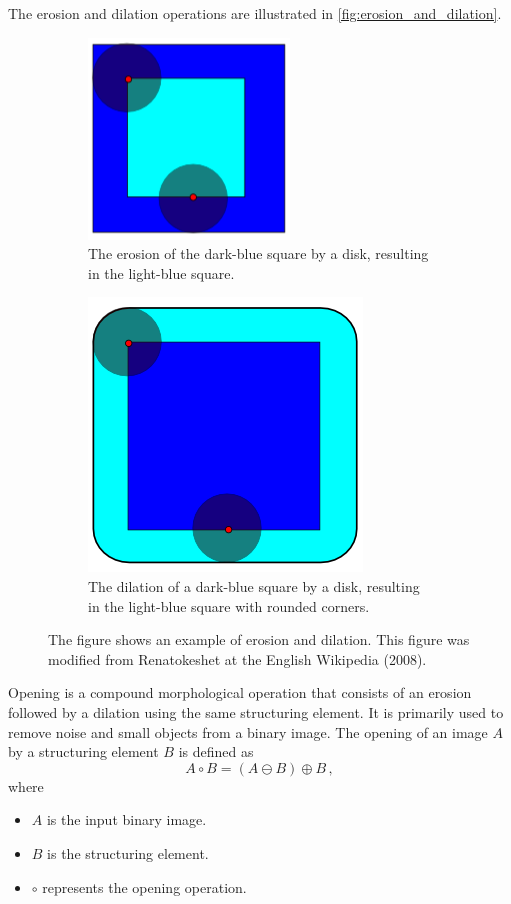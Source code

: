 The erosion and dilation operations are illustrated in \autoref{fig:erosion_and_dilation}.
\begin{figure}[h]
  \centering
  \begin{subfigure}[t]{0.45\textwidth}
    \centering
    \includegraphics[width=0.5\linewidth]{figures/detection/erosion.png}
    \caption{The erosion of the dark-blue square by a disk, resulting in the light-blue square.}
    \label{fig:erosion}
  \end{subfigure}
  \quad
  \begin{subfigure}[t]{0.45\textwidth}
    \centering
    \includegraphics[width=0.5\linewidth]{figures/detection/dilation.png}
    \caption{The dilation of a dark-blue square by a disk, resulting in the light-blue square with rounded corners.}
    \label{fig:dilation}
  \end{subfigure}
  \caption{The figure shows an example of erosion and dilation. This figure was modified from Renatokeshet at the English Wikipedia (2008).}
  \label{fig:erosion_and_dilation}
\end{figure}

Opening is a compound morphological operation that consists of an erosion followed by a dilation using the same structuring element. It is primarily used to remove noise and small objects from a binary image. The opening of an image $A$ by a structuring element $B$ is defined as
\begin{equation}
  A \circ B = (A \ominus B) \oplus B\,,
  \label{eq:opening}
\end{equation}
where
\begin{itemize}
  \item $A$ is the input binary image.
  \item $B$ is the structuring element.
  \item $\circ$ represents the opening operation.
\end{itemize}

